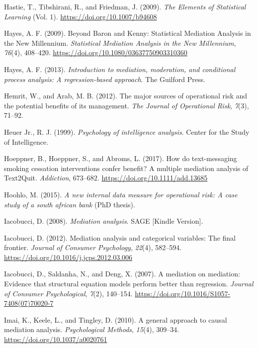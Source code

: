 \documentclass[]{DissertateUSU}
\begin{document}
\hypertarget{ref-Hastie2009}{}
Hastie, T., Tibshirani, R., and Friedman, J. (2009). \emph{The Elements
of Statistical Learning} (Vol. 1). \url{https://doi.org/10.1007/b94608}

\hypertarget{ref-Hayes2009}{}
Hayes, A. F. (2009). Beyond Baron and Kenny: Statistical Mediation
Analysis in the New Millennium. \emph{Statistical Mediation Analysis in
the New Millennium}, \emph{76}(4), 408--420.
\url{https://doi.org/10.1080/03637750903310360}

\hypertarget{ref-Hayes2013book}{}
Hayes, A. F. (2013). \emph{Introduction to mediation, moderation, and
conditional process analysis: A regression-based approach}. The Guilford
Press.

\hypertarget{ref-hemrit2012major}{}
Hemrit, W., and Arab, M. B. (2012). The major sources of operational
risk and the potential benefits of its management. \emph{The Journal of
Operational Risk}, \emph{7}(3), 71--92.

\hypertarget{ref-intelbook1999}{}
Heuer Jr., R. J. (1999). \emph{Psychology of intelligence analysis}.
Center for the Study of Intelligence.

\hypertarget{ref-Hoeppner2017}{}
Hoeppner, B., Hoeppner, S., and Abroms, L. (2017). How do text-messaging
smoking cessation interventions confer benefit? A multiple mediation
analysis of Text2Quit. \emph{Addiction}, 673--682.
\url{https://doi.org/10.1111/add.13685}

\hypertarget{ref-hoohlo2015new}{}
Hoohlo, M. (2015). \emph{A new internal data measure for operational
risk: A case study of a south african bank} (PhD thesis).

\hypertarget{ref-Iacobucci2008book}{}
Iacobucci, D. (2008). \emph{Mediation analysis}. SAGE {[}Kindle
Version{]}.

\hypertarget{ref-Iacobucci2012}{}
Iacobucci, D. (2012). Mediation analysis and categorical variables: The
final frontier. \emph{Journal of Consumer Psychology}, \emph{22}(4),
582--594. \url{https://doi.org/10.1016/j.jcps.2012.03.006}

\hypertarget{ref-Iacobucci2007}{}
Iacobucci, D., Saldanha, N., and Deng, X. (2007). A mediation on
mediation: Evidence that structural equation models perform better than
regression. \emph{Journal of Consumer Psychological}, \emph{7}(2),
140--154. \url{https://doi.org/10.1016/S1057-7408(07)70020-7}

\hypertarget{ref-Imai2010a}{}
Imai, K., Keele, L., and Tingley, D. (2010). A general approach to
causal mediation analysis. \emph{Psychological Methods}, \emph{15}(4),
309--34. \url{https://doi.org/10.1037/a0020761}
\end{document}

